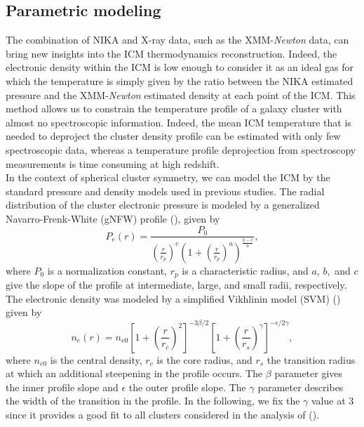 \documentclass[traditabstract]{aa}
\begin{document}
\subsection{Parametric modeling}\label{sec:modeling}
The  combination of NIKA and X-ray data, such as the XMM-{\it Newton} data, can bring new insights into the ICM thermodynamics reconstruction. Indeed, the electronic density within the ICM is low enough to consider it as an ideal gas for which the temperature is simply given by the ratio between the NIKA estimated pressure and the XMM-{\it Newton} estimated density at each point of the ICM. This method allows us to constrain the temperature profile of a galaxy cluster with almost no spectroscopic information. Indeed, the mean ICM temperature that is needed to deproject the cluster density profile can be estimated with only few spectroscopic data, whereas a temperature profile deprojection from spectroscopy measurements is time consuming at high redshift.\\
In the context of spherical cluster symmetry, we can model the ICM by the standard pressure and density models used in previous studies.
The radial distribution of the cluster electronic pressure is modeled by a generalized Navarro-Frenk-White (gNFW) profile (\citealt{gnfw_prof}), given by
\begin{equation}
        P_e(r) = \frac{P_0}{\left(\frac{r}{r_p}\right)^c \left(1+\left(\frac{r}{r_p}\right)^a\right)^{\frac{b-c}{a}}},
\label{eq:gNFW}
\end{equation}
where $P_0$ is a normalization constant, $r_p$ is a characteristic radius, and $a$, $b,$ and $c$ give the slope of the profile at intermediate, large, and small radii, respectively. The electronic density was modeled by a simplified Vikhlinin model (SVM) (\citealt{SVM_prof}) given by
\begin{equation}
        n_e(r) = n_{e0} \left[1+\left(\frac{r}{r_c}\right)^2 \right]^{-3 \beta /2} \left[ 1+\left(\frac{r}{r_s}\right)^{\gamma} \right]^{-\epsilon/2 \gamma},
\label{eq:SVM}
\end{equation}
where $n_{e0}$ is the central density, $r_c$ is the core radius, and $r_s$ the transition radius at which an additional steepening in the profile occurs. The $\beta$ parameter gives the inner profile slope and $\epsilon$ the outer profile slope. The $\gamma$ parameter describes the width of the transition in the profile. In the following, we fix the $\gamma$ value at 3 since it provides a good fit to all clusters considered in the analysis of (\citealt{gamma_val}).\\
\end{document}
